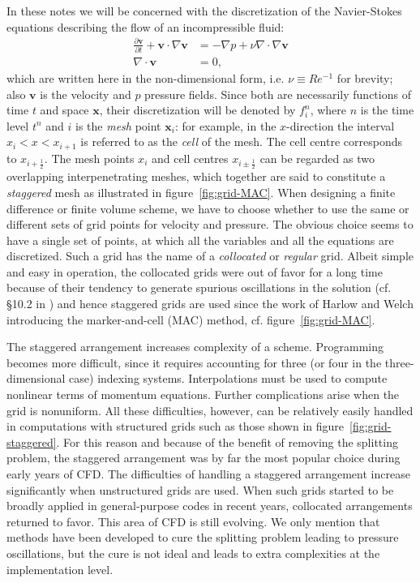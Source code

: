\documentclass{article}
\begin{document}
In these notes we will be concerned with the discretization of the Navier-Stokes equations describing the flow of an incompressible fluid:
\begin{subequations}
\label{eqs:NSE}
\begin{align}
\label{eqn:momentum}
\frac{\partial \boldsymbol{v}}{\partial t} + \boldsymbol{v} \cdot \nabla \boldsymbol{v} &= -\nabla p + \nu \nabla \cdot \nabla \boldsymbol{v} \\
\label{eqn:continuity}
\nabla \cdot \boldsymbol{v} &= 0,
\end{align}
\end{subequations}
which are written here in the non-dimensional form, i.e. $\nu \equiv Re^{-1}$ for brevity; also $\boldsymbol{v}$ is the velocity and $p$ pressure fields. Since both are necessarily functions of time $t$ and space $\boldsymbol{x}$, their discretization will be denoted by $f^{n}_{i}$, where $n$ is the time level $t^{n}$ and $i$ is the \textit{mesh} point $\boldsymbol{x}_{i}$: for example, in the $x$-direction the interval $x_{i} < x < x_{i+1}$ is referred to as the \textit{cell} of the mesh. The cell centre corresponds to $x_{i+\frac{1}{2}}$. The mesh points $x_{i}$ and cell centres $x_{i \pm \frac{1}{2}}$ can be regarded as two overlapping interpenetrating meshes, which together are said to constitute a \textit{staggered} mesh as illustrated in figure~\ref{fig:grid-MAC}. When designing a finite difference or finite volume scheme, we have to choose whether to use the same or different sets of grid points for velocity and pressure. The obvious choice seems to have a single set of points, at which all the variables and all the equations are discretized. Such a grid
has the name of a \textit{collocated} or \textit{regular} grid. Albeit simple and easy in operation, the collocated grids were out of favor for a long time because of their tendency to generate spurious oscillations in the solution (cf. \S 10.2 in \cite{Zikanov:2010}) and hence staggered grids are used since the work of Harlow and Welch \cite{Harlow:1965} introducing the marker-and-cell (MAC) method, cf. figure~\ref{fig:grid-MAC}.

The staggered arrangement increases complexity of a scheme. Programming becomes more difficult, since it requires accounting for three (or four in the three-dimensional case) indexing systems. Interpolations must be used to compute nonlinear terms of momentum equations. Further complications arise when the grid is nonuniform. All these difficulties, however, can be relatively easily handled in computations with structured grids such as those shown in figure~\ref{fig:grid-staggered}. For this reason and because of the benefit of removing the splitting problem, the staggered arrangement was by far the most popular choice during early years of CFD. The difficulties of handling a staggered arrangement increase significantly when unstructured grids are used. When such grids started to
be broadly applied in general-purpose codes in recent years, collocated arrangements returned to favor. This area of CFD is still evolving. We only mention that methods have been developed to cure the splitting problem leading to pressure oscillations, but the cure is not ideal and leads to extra complexities at the implementation level.
\end{document}
